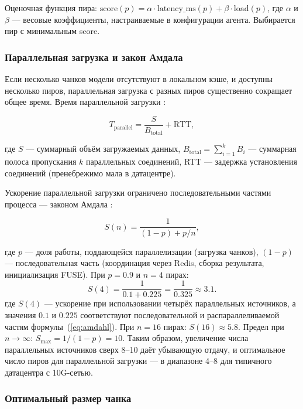 Оценочная функция пира: $\mathrm{score}(p) = \alpha \cdot \mathrm{latency\_ms}(p) + \beta \cdot \mathrm{load}(p)$, где $\alpha$ и $\beta$ --- весовые коэффициенты, настраиваемые в конфигурации агента. Выбирается пир с минимальным score.

\subsubsection{Параллельная загрузка и закон Амдала}

Если несколько чанков модели отсутствуют в локальном кэше, и доступны несколько пиров, параллельная загрузка с разных пиров существенно сокращает общее время. Время параллельной загрузки \cite{zipf_law}:

\begin{equation}
T_{\mathrm{parallel}} = \frac{S}{B_{\mathrm{total}}} + \mathrm{RTT},
\label{eq:p2p_time}
\end{equation}

где $S$ --- суммарный объём загружаемых данных, $B_{\mathrm{total}} = \sum_{i=1}^{k} B_i$ --- суммарная полоса пропускания $k$ параллельных соединений, RTT --- задержка установления соединений (пренебрежимо мала в датацентре).

Ускорение параллельной загрузки ограничено последовательными частями процесса --- законом Амдала \cite{amdahl_law}:

\begin{equation}
S(n) = \frac{1}{(1-p) + p/n},
\label{eq:amdahl}
\end{equation}

где $p$ --- доля работы, поддающейся параллелизации (загрузка чанков), $(1-p)$ --- последовательная часть (координация через Redis, сборка результата, инициализация FUSE). При $p = 0.9$ и $n = 4$ пирах:
\begin{equation}
S(4) = \frac{1}{0.1 + 0.225} = \frac{1}{0.325} \approx 3.1.
\end{equation}
где $S(4)$ --- ускорение при использовании четырёх параллельных источников, а значения $0.1$ и $0.225$ соответствуют последовательной и распараллеливаемой частям формулы~(\ref{eq:amdahl}).
При $n = 16$ пирах: $S(16) \approx 5.8$. Предел при $n \to \infty$: $S_{\max} = 1/(1-p) = 10$. Таким образом, увеличение числа параллельных источников сверх 8--10 даёт убывающую отдачу, и оптимальное число пиров для параллельной загрузки --- в диапазоне 4--8 для типичного датацентра с 10G-сетью.

\subsubsection{Оптимальный размер чанка}

